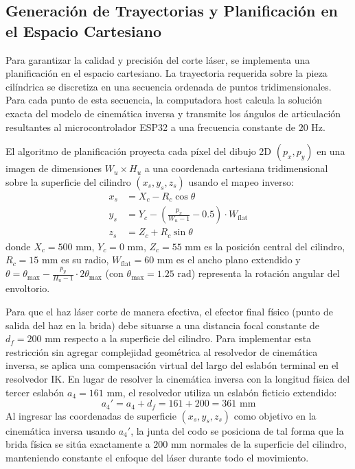 \documentclass[conference,a4paper]{IEEEtran}
\begin{document}
\subsection{Generación de Trayectorias y Planificación en el Espacio Cartesiano}
Para garantizar la calidad y precisión del corte láser, se implementa una planificación en el espacio cartesiano. La trayectoria requerida sobre la pieza cilíndrica se discretiza en una secuencia ordenada de puntos tridimensionales. Para cada punto de esta secuencia, la computadora host calcula la solución exacta del modelo de cinemática inversa y transmite los ángulos de articulación resultantes al microcontrolador ESP32 a una frecuencia constante de $20\text{ Hz}$.

El algoritmo de planificación proyecta cada píxel del dibujo 2D $(p_x, p_y)$ en una imagen de dimensiones $W_u \times H_u$ a una coordenada cartesiana tridimensional sobre la superficie del cilindro $(x_s, y_s, z_s)$ usando el mapeo inverso:
\begin{align}
x_s &= X_c - R_c \cos\theta \label{eq:map_xs} \\
y_s &= Y_c - \left( \frac{p_x}{W_u - 1} - 0.5 \right) \cdot W_{\text{flat}} \label{eq:map_ys} \\
z_s &= Z_c + R_c \sin\theta \label{eq:map_zs}
\end{align}
donde $X_c = 500\text{ mm}$, $Y_c = 0\text{ mm}$, $Z_c = 55\text{ mm}$ es la posición central del cilindro, $R_c = 15\text{ mm}$ es su radio, $W_{\text{flat}} = 60\text{ mm}$ es el ancho plano extendido y $\theta = \theta_{\text{max}} - \frac{p_y}{H_u - 1} \cdot 2\theta_{\text{max}}$ (con $\theta_{\text{max}} = 1.25\text{ rad}$) representa la rotación angular del envoltorio.

Para que el haz láser corte de manera efectiva, el efector final físico (punto de salida del haz en la brida) debe situarse a una distancia focal constante de $d_f = 200\text{ mm}$ respecto a la superficie del cilindro. Para implementar esta restricción sin agregar complejidad geométrica al resolvedor de cinemática inversa, se aplica una compensación virtual del largo del eslabón terminal en el resolvedor IK. En lugar de resolver la cinemática inversa con la longitud física del tercer eslabón $a_4 = 161\text{ mm}$, el resolvedor utiliza un eslabón ficticio extendido:
\begin{equation}
a_4' = a_4 + d_f = 161 + 200 = 361\text{ mm}
\label{eq:focal_comp}
\end{equation}
Al ingresar las coordenadas de superficie $(x_s, y_s, z_s)$ como objetivo en la cinemática inversa usando $a_4'$, la junta del codo se posiciona de tal forma que la brida física se sitúa exactamente a $200\text{ mm}$ normales de la superficie del cilindro, manteniendo constante el enfoque del láser durante todo el movimiento.
\end{document}
